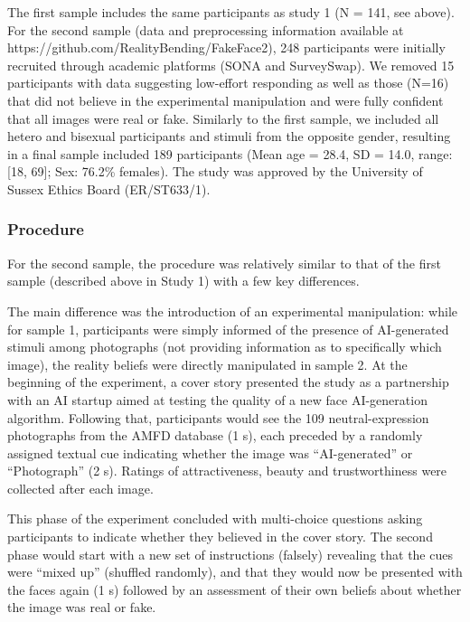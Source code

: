 \documentclass[
  jou,
  floatsintext,
  longtable,
  nolmodern,
  notxfonts,
  notimes,
  colorlinks=true,linkcolor=blue,citecolor=blue,urlcolor=blue]{apa7}
\begin{document}
The first sample includes the same participants as study 1 (N = 141, see
above). For the second sample (data and preprocessing information
available at https://github.com/RealityBending/FakeFace2), 248
participants were initially recruited through academic platforms (SONA
and SurveySwap). We removed 15 participants with data suggesting
low-effort responding as well as those (N=16) that did not believe in
the experimental manipulation and were fully confident that all images
were real or fake. Similarly to the first sample, we included all hetero
and bisexual participants and stimuli from the opposite gender,
resulting in a final sample included 189 participants (Mean age = 28.4,
SD = 14.0, range: {[}18, 69{]}; Sex: 76.2\% females). The study was
approved by the University of Sussex Ethics Board (ER/ST633/1).

\subsubsection{Procedure}\label{procedure-1}

For the second sample, the procedure was relatively similar to that of
the first sample (described above in Study 1) with a few key
differences.

The main difference was the introduction of an experimental
manipulation: while for sample 1, participants were simply informed of
the presence of AI-generated stimuli among photographs (not providing
information as to specifically which image), the reality beliefs were
directly manipulated in sample 2. At the beginning of the experiment, a
cover story presented the study as a partnership with an AI startup
aimed at testing the quality of a new face AI-generation algorithm.
Following that, participants would see the 109 neutral-expression
photographs from the AMFD database (1 s), each preceded by a randomly
assigned textual cue indicating whether the image was ``AI-generated''
or ``Photograph'' (2 s). Ratings of attractiveness, beauty and
trustworthiness were collected after each image.

This phase of the experiment concluded with multi-choice questions
asking participants to indicate whether they believed in the cover
story. The second phase would start with a new set of instructions
(falsely) revealing that the cues were ``mixed up'' (shuffled randomly),
and that they would now be presented with the faces again (1 s) followed
by an assessment of their own beliefs about whether the image was real
or fake.
\end{document}
